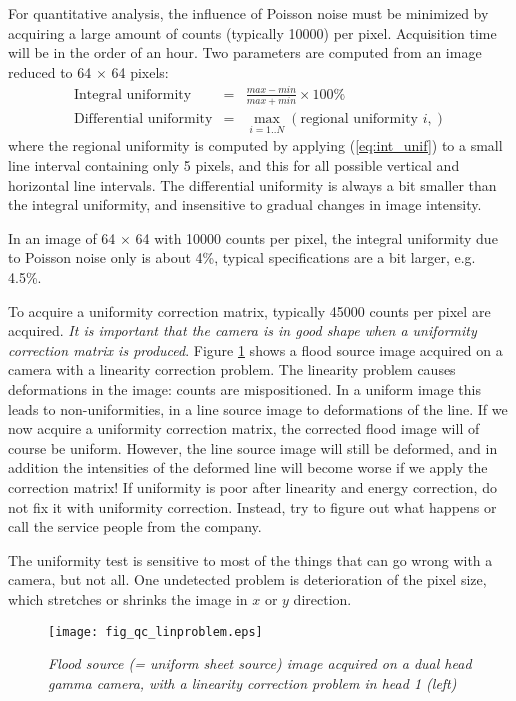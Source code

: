 For quantitative analysis, the influence of Poisson noise must be minimized by
acquiring a large amount of counts (typically 10000) per pixel. Acquisition
time will be in the order of an hour. Two parameters are computed from an
image reduced to 64 $\times$ 64 pixels:
\begin{eqnarray}
 \mbox{Integral uniformity} & = & \frac{max - min}{max + min} \times 100 \%
      \label{eq:int_unif}\\
 \mbox{Differential uniformity} & = & \max_{i=1..N} \left( \mbox{regional
 uniformity $i$}, \right)
\end{eqnarray}
where the regional uniformity is computed by applying (\ref{eq:int_unif}) to a
small line interval containing only 5 pixels, and this for all possible
vertical and horizontal line intervals. The differential uniformity is always
a bit smaller than the integral uniformity, and insensitive to gradual changes
in image intensity.

In an image of 64 $\times$ 64 with 10000 counts per pixel, the integral
uniformity due to Poisson noise only is about 4\%, typical specifications are
a bit larger, e.g. 4.5\%.

To acquire a uniformity correction matrix, typically 45000 counts per pixel
are acquired. {\em It is important that the camera is in good shape when a
uniformity correction matrix is produced}. Figure \ref{fig:qc_linproblem}
shows a flood source image acquired on a camera with a linearity correction
problem. The linearity problem causes deformations in the image: counts are
mispositioned. In a uniform image this leads to non-uniformities, in a line
source image to deformations of the line. If we now acquire a uniformity
correction matrix, the corrected flood image will of course be uniform.
However, the line source image will still be deformed, and in addition the
intensities of the deformed line will become worse if we apply the correction
matrix! If uniformity is poor after linearity and energy correction, do not
fix it with uniformity correction. Instead, try to figure out what happens or
call the service people from the company.

The uniformity test is sensitive to most of the things that can go wrong with
a camera, but not all. One undetected problem is deterioration of the pixel
size, which stretches or shrinks the image in $x$ or $y$ direction.

\begin{figure}[tb]
\centering
\texttt{[image: fig\_qc\_linproblem.eps]}
\caption{\label{fig:qc_linproblem} \emph{Flood source (= uniform sheet source)
image acquired on a dual head gamma camera, with a linearity correction
problem in head 1 (left)}}
\end{figure}

